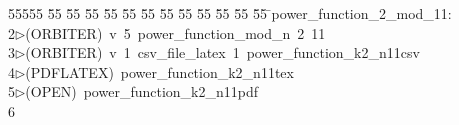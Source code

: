 %
%
\begin{tabbing}
55555 \= 55 \= 55 \= 55 \= 55 \= 55 \= 55 \= 55 \= 55 \= 55 \= 55 \= 55 \= 55 \= \>power\_function\_2\_mod\_11:\\[0pt]
2\>$\triangleright$\>(ORBITER)\ v\ 5\ power\_function\_mod\_n\ 2\ 11\\[0pt]
3\>$\triangleright$\>(ORBITER)\ v\ 1\ csv\_file\_latex\ 1\ power\_function\_k2\_n11csv\\[0pt]
4\>$\triangleright$\>(PDFLATEX)\ power\_function\_k2\_n11tex\\[0pt]
5\>$\triangleright$\>(OPEN)\ power\_function\_k2\_n11pdf\\[0pt]
6\>\end{tabbing}
